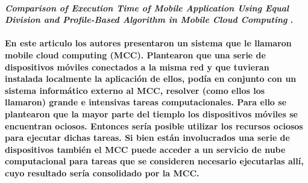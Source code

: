 
\paragraph{
    \textbf{\emph{Comparison of Execution Time of Mobile
            Application Using Equal Division
            and Profile-Based Algorithm in Mobile
            Cloud Computing}
    }
    \cite[pág. 59]{chaudhary_microservices_2020}.
}


\paragraph{
    En este articulo los autores presentaron un sistema que le llamaron mobile cloud computing (MCC).
    Plantearon que una serie de dispositivos móviles conectados a la misma red y que tuvieran instalada localmente la aplicación de ellos, podía en conjunto con un sistema informático externo al MCC, resolver (como ellos los llamaron) grande e intensivas tareas computacionales. Para ello se plantearon que la mayor parte del tiemplo los dispositivos móviles se encuentran ociosos. Entonces sería posible utilizar los recursos ociosos para ejecutar dichas tareas. Si bien están involucrados una serie de dispositivos también el MCC puede acceder a un servicio de nube computacional para tareas que se consideren necesario ejecutarlas allí, cuyo resultado sería consolidado por la MCC.
}


